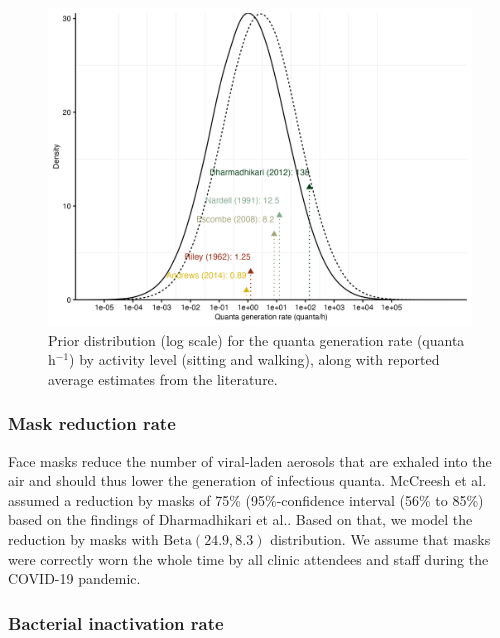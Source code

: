 \documentclass[fleqn,11pt]{wlscirep_supp}
\begin{document}
\begin{figure}[!htpb]
    \centering
    \includegraphics{results/inputs/quanta-generation-rate.png}
    \caption{Prior distribution (log scale) for the quanta generation rate (quanta h$^{-1}$) by activity level (sitting and walking), along with reported average estimates from the literature\cite{Andrews2014JID,Riley1962ARRD,Escombe2008PLoSMed,Nardell1991ARRD,Dharmadhikari2012AJRCCM}.}
    \label{fig:quanta-distribution}
\end{figure}

\subsubsection{Mask reduction rate}

Face masks reduce the number of viral-laden aerosols that are exhaled into the air\cite{Milton2013PLoSPathogens,Leung2020NatMed} and should thus lower the generation of infectious quanta. McCreesh et al. assumed a reduction by masks of 75\% (95\%-confidence interval (56\% to 85\%) based on the findings of Dharmadhikari et al.\cite{Dharmadhikari2012AJRCCM}. Based on that, we model the reduction by masks with $\mathrm{Beta}(24.9, 8.3)$ distribution. We assume that masks were correctly worn the whole time by all clinic attendees and staff during the COVID-19 pandemic. 

\subsubsection{Bacterial inactivation rate}
\end{document}
